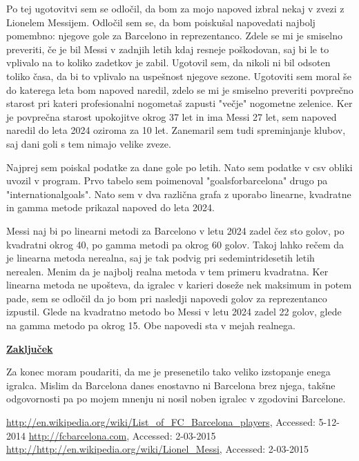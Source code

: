 \documentclass[11pt,a4paper]{article}
\begin{document}
Po tej ugotovitvi sem se odločil, da bom za mojo napoved izbral nekaj v zvezi z Lionelem Messijem. Odločil sem se, da bom poiskušal napovedati najbolj pomembno: njegove gole za Barcelono in reprezentanco. Zdele se mi je smiselno preveriti, če je bil Messi v zadnjih letih kdaj resneje poškodovan, saj bi le to vplivalo na to koliko zadetkov je zabil. Ugotovil sem, da nikoli ni bil odsoten toliko časa, da bi to vplivalo na uspešnost njegove sezone. Ugotoviti sem moral še do katerega leta bom napoved naredil, zdelo se mi je smiselno preveriti povprečno starost pri kateri profesionalni nogometaš zapusti "večje" nogometne zelenice. Ker je povprečna starost upokojitve okrog 37 let in ima Messi 27 let, sem napoved naredil do leta 2024 oziroma za 10 let. Zanemaril sem tudi spreminjanje klubov, saj dani goli s tem nimajo velike zveze.

Najprej sem poiskal podatke za dane gole po letih. Nato sem podatke v csv obliki uvozil v program. Prvo tabelo sem poimenoval "goalsforbarcelona" drugo pa "internationalgoals". Nato sem v dva različna grafa z uporabo linearne, kvadratne in gamma metode prikazal napoved do leta 2024.




\newpage
Messi naj bi po linearni metodi za Barcelono v letu 2024 zadel čez sto golov, po kvadratni okrog 40, po gamma metodi pa okrog 60 golov. Takoj lahko rečem da je linearna metoda nerealna, saj je tak podvig pri sedemintridesetih letih nerealen. Menim da je najbolj realna metoda v tem primeru kvadratna. Ker linearna metoda ne upošteva, da igralec v karieri doseže nek maksimum in potem pade, sem se odločil da jo bom pri nasledji napovedi golov za reprezentanco izpustil. Glede na kvadratno metodo bo Messi v letu 2024 zadel 22 golov, glede na gamma metodo pa okrog 15. Obe napovedi sta v mejah realnega.


\underline{\textbf{Zaključek}}

Za konec moram poudariti, da me je presenetilo tako veliko izstopanje enega igralca. Mislim da Barcelona danes enostavno ni Barcelona brez njega, takšne odgovornosti pa po mojem mnenju ni nosil noben igralec v zgodovini Barcelone.

\begin{thebibliography}{9}
\url{http://en.wikipedia.org/wiki/List_of_FC_Barcelona_players},
{Accessed: 5-12-2014}
\url{http://fcbarcelona.com},
{Accessed: 2-03-2015}
\url{http://http://en.wikipedia.org/wiki/Lionel_Messi},
{Accessed: 2-03-2015}
\end{thebibliography}
\end{document}
